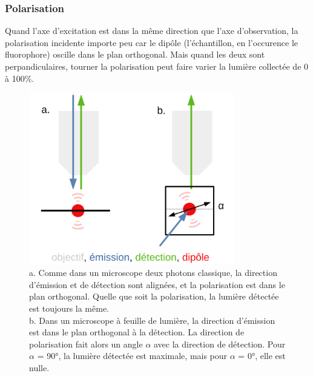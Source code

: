 
\subsubsection{Polarisation}


Quand l'axe d'excitation est dans la même direction que l'axe d'observation, la polarisation incidente importe peu car le dipôle (l'échantillon, en l'occurence le fluorophore) oscille dans le plan orthogonal. Mais quand les deux sont perpandiculaires, tourner la polarisation peut faire varier la lumière collectée de 0 à 100\%.

\begin{figure}
\centering
\includegraphics[width=0.8\textwidth]{./files/polarization_plane.svg.png}
\caption{a. Comme dans un microscope deux photons classique, la direction d'émission et de détection sont alignées, et la polarisation est dans le plan orthogonal. Quelle que soit la polarisation, la lumière détectée est toujours la même.
\\ b. Dans un microscope à feuille de lumière, la direction d'émission est dans le plan orthogonal à la détection. La direction de polarisation fait alors un angle $\alpha$ avec la direction de détection. Pour $\alpha$ = 90°, la lumière détectée est maximale, mais pour $\alpha$ = 0°, elle est nulle.}
\end{figure}


